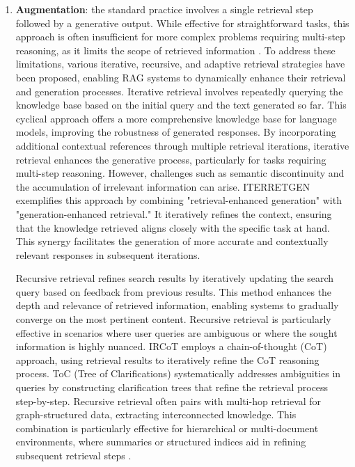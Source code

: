 \begin{enumerate}
	\item {\textbf{Augmentation}: the standard practice involves a single retrieval step followed by a generative output. While effective for straightforward tasks, this approach is often insufficient for more complex problems requiring multi-step reasoning, as it limits the scope of retrieved information \cite{yoran2023making}. To address these limitations, various iterative, recursive, and adaptive retrieval strategies have been proposed, enabling RAG systems to dynamically enhance their retrieval and generation processes.
	      Iterative retrieval involves repeatedly querying the knowledge base based on the initial query and the text generated so far. This cyclical approach offers a more comprehensive knowledge base for language models, improving the robustness of generated responses. By incorporating additional contextual references through multiple retrieval iterations, iterative retrieval enhances the generative process, particularly for tasks requiring multi-step reasoning. However, challenges such as semantic discontinuity and the accumulation of irrelevant information can arise.
	      ITERRETGEN \cite{shao2023enhancing} exemplifies this approach by combining "retrieval-enhanced generation" with "generation-enhanced retrieval." It iteratively refines the context, ensuring that the knowledge retrieved aligns closely with the specific task at hand. This synergy facilitates the generation of more accurate and contextually relevant responses in subsequent iterations.

	      Recursive retrieval refines search results by iteratively updating the search query based on feedback from previous results. This method enhances the depth and relevance of retrieved information, enabling systems to gradually converge on the most pertinent content. Recursive retrieval is particularly effective in scenarios where user queries are ambiguous or where the sought information is highly nuanced.
	      IRCoT \cite{trivedi2022interleaving} employs a chain-of-thought (CoT) approach, using retrieval results to iteratively refine the CoT reasoning process. ToC (Tree of Clarifications) \cite{kim2023tree} systematically addresses ambiguities in queries by constructing clarification trees that refine the retrieval process step-by-step.
	      Recursive retrieval often pairs with multi-hop retrieval for graph-structured data, extracting interconnected knowledge. This combination is particularly effective for hierarchical or multi-document environments, where summaries or structured indices aid in refining subsequent retrieval steps \cite{li2023chain}.

}
\end{enumerate}
